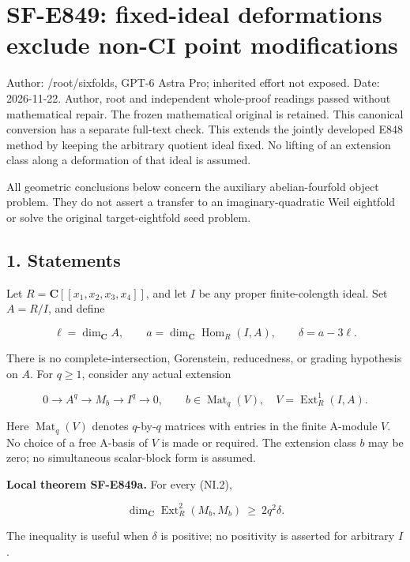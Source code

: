 \section{SF-E849: fixed-ideal deformations exclude non-CI point modifications}\label{SF-E849:section}

Author: /root/sixfolds, GPT-6 Astra Pro; inherited effort not exposed.
Date: 2026-11-22. Author, root and independent whole-proof readings passed without mathematical repair. The frozen mathematical original is retained.
This canonical conversion has a separate full-text check.
This extends the jointly developed E848 method by keeping the arbitrary
quotient ideal fixed. No lifting of an extension class along a deformation
of that ideal is assumed.

All geometric conclusions below concern the auxiliary abelian-fourfold
object problem. They do not assert a transfer to an imaginary-quadratic
Weil eightfold or solve the original target-eightfold seed problem.

\subsection{1. Statements}\label{SF-E849:s1}

Let \(R=\mathbf C[[x_1,x_2,x_3,x_4]]\), and let \(I\) be any proper finite-colength ideal.
Set \(A=R/I\), and define

\[
 \ell=\dim_{\mathbf C}A,\qquad
 a=\dim_{\mathbf C}\operatorname{Hom}_R(I,A),\qquad
 \delta=a-3\ell.
 \tag{NI.1}
\]

There is no complete-intersection, Gorenstein, reducedness, or grading
hypothesis on \(A\). For \(q\ge 1\), consider any actual extension

\[
 0\longrightarrow A^q\longrightarrow M_b\longrightarrow I^q
       \longrightarrow0,\qquad
 b\in\operatorname{Mat}_q(V),\quad
 V=\operatorname{Ext}^1_R(I,A).
 \tag{NI.2}
\]

Here \(\operatorname{Mat}_q(V)\) denotes \(q\)-by-\(q\) matrices with entries in the finite
A-module \(V\). No choice of a free A-basis of \(V\) is made or required.
The extension class \(b\) may be zero; no simultaneous scalar-block
form is assumed.

\textbf{Local theorem SF-E849a.} For every (NI.2),

\[
 \dim_{\mathbf C}\operatorname{Ext}^2_R(M_b,M_b)
                  \ \ge\ 2q^2\delta.
 \tag{NI.3}
\]

The inequality is useful when \(\delta\) is positive; no positivity is
asserted for arbitrary \(I\).

